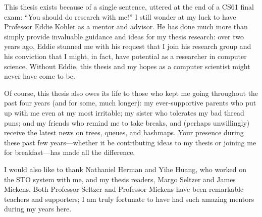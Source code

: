 This thesis exists because of a single sentence, uttered at the end of a CS61 final exam: ``You should do research with me!'' I still wonder at my luck to have Professor Eddie Kohler as a mentor and advisor. He has done much more than simply provide invaluable guidance and ideas for my thesis research: over two years ago, Eddie stunned me with his request that I join his research group and his conviction that I might, in fact, have potential as a researcher in computer science. Without Eddie, this thesis and my hopes as a computer scientist might never have come to be.

    Of course, this thesis also owes its life to those who kept me going throughout the past four years (and for some, much longer): my ever-supportive parents who put up with me even at my most irritable; my sister who tolerates my bad thread puns; and my friends who remind me to take breaks, and (perhaps unwillingly) receive the latest news on trees, queues, and hashmaps. Your presence during these past few years---whether it be contributing ideas to my thesis or joining me for breakfast---has made all the difference.

        I would also like to thank Nathaniel Herman and Yihe Huang, who worked on the STO system with me, and my thesis readers, Margo Seltzer and James Mickens. Both Professor Seltzer and Professor Mickens have been remarkable teachers and supporters; I am truly fortunate to have had such amazing mentors during my years here.
